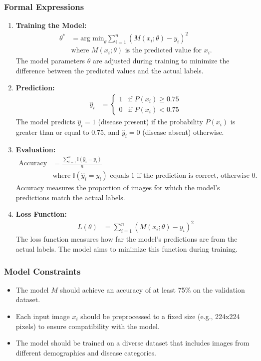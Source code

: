 \documentclass[12pt]{article}
\begin{document}
\subsubsection{Formal Expressions}
\begin{enumerate}
  \item \textbf{Training the Model:}
    \begin{align*}
      \theta^* &= \text{arg min}_\theta \sum_{i=1}^n (M(x_i; \theta) - y_i)^2 \\
      &\text{where } M(x_i; \theta) \text{ is the predicted value for } x_i.
    \end{align*}
    The model parameters \( \theta \) are adjusted during training to minimize the difference between the predicted values and the actual labels.

  \item \textbf{Prediction:}
    \begin{align*}
      \hat{y}_i &= \begin{cases}
        1 & \text{if } P(x_i) \geq 0.75 \\
        0 & \text{if } P(x_i) < 0.75
      \end{cases}
    \end{align*}
    The model predicts \( \hat{y}_i = 1 \) (disease present) if the probability \( P(x_i) \) is greater than or equal to 0.75, and \( \hat{y}_i = 0 \) (disease absent) otherwise.

  \item \textbf{Evaluation:}
    \begin{align*}
      \text{Accuracy} &= \frac{\sum_{i=1}^n \mathbb{I}(\hat{y}_i = y_i)}{n} \\
      &\text{where } \mathbb{I}(\hat{y}_i = y_i) \text{ equals 1 if the prediction is correct, otherwise 0.}
    \end{align*}
    Accuracy measures the proportion of images for which the model's predictions match the actual labels.

  \item \textbf{Loss Function:}
    \begin{align*}
      L(\theta) &= \sum_{i=1}^n (M(x_i; \theta) - y_i)^2
    \end{align*}
    The loss function measures how far the model's predictions are from the actual labels. The model aims to minimize this function during training.
\end{enumerate}

\subsubsection{Model Constraints}
\begin{itemize}
  \item The model \( M \) should achieve an accuracy of at least 75\% on the validation dataset.
  \item Each input image \( x_i \) should be preprocessed to a fixed size (e.g., 224x224 pixels) to ensure compatibility with the model.
  \item The model should be trained on a diverse dataset that includes images from different demographics and disease categories.
\end{itemize}
\end{document}
